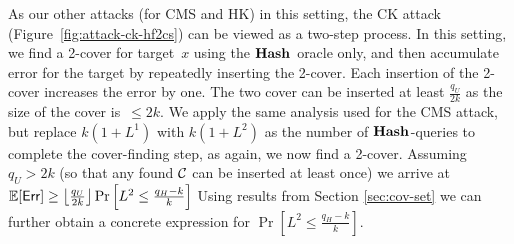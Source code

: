 As our other attacks (for CMS and HK) in this setting, the CK attack (Figure~\ref{fig:attack-ck-hf2cs}) can be viewed as a two-step process.  In this setting, we find a 2-cover for target~$x$ using the $\textup{\textbf{Hash}}\hspace{0.5pt}$ oracle only, and then accumulate error for the target by repeatedly inserting the 2-cover. Each insertion of the 2-cover increases the error by one. The two cover can be inserted at least $\frac{q_U}{2k}$ as the size of the cover is~$\leq 2k$.
We apply the same analysis used for the CMS attack, but replace $k(1 + L^1)$ with $k(1 + L^2)$ as the number of $\textup{\textbf{Hash}}\hspace{0.5pt}$-queries to complete the cover-finding step, as again, we now find a 2-cover. Assuming $q_U > 2k$ (so that any found $\mathcal{C}$ can be inserted at least once)
we arrive at
$\mathbb{E}[\mathsf{Err}] \geq \left\lfloor\frac{q_U}{2k}\right\rfloor \Pr\left[L^2 \leq \frac{q_H-k}{k}\right]$
Using results from Section \ref{sec:cov-set} we can further obtain a concrete expression for $\Pr\left[L^2 \leq \frac{q_H-k}{k}\right]$. 

